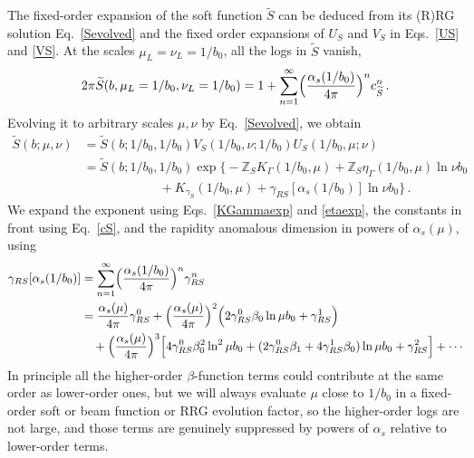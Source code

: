 \documentclass[a4,letterpaper,11pt]{article}
\newcommand{\nn}{\nonumber}
\newcommand{\be}{\begin{equation}}
\newcommand{\ee}{\end{equation}}
\newcommand{\as}{\alpha_s}
\newcommand{\zed}{\mathbb{Z}}
\newcommand{\wt}{\widetilde}
\newcommand{\eq}[1]{Eq.~\eqref{#1}}
\newcommand{\eqs}[2]{Eqs.~\eqref{#1} and \eqref{#2}}
\begin{document}
The fixed-order expansion of the soft function $\wt S$ can be deduced from its (R)RG solution \eq{Sevolved} and the fixed order expansions of $U_S$ and $V_S$ in \eqs{US}{VS}. At the scales $\mu_L =\nu_L= 1/b_0$, all the logs in $\wt S$ vanish,
\be
\label{cS}
2\pi \wt S(b,\mu_L=1/b_0,\nu_L=1/b_0) = 1 + \sum_{n=1}^\infty \Bigl(\frac{\as(1/b_0)}{4\pi}\Bigr)^n c_{\wt S}^n\,.
\ee
Evolving it to arbitrary scales $\mu,\nu$ by \eq{Sevolved}, we obtain
\begin{align}
\label{Sevolved2}
\wt S(b;\mu,\nu) &= \wt S(b;1/b_0,1/b_0) V_S(1/b_0,\nu;1/b_0) U_S(1/b_0,\mu;\nu) \\
&=  \wt S(b;1/b_0,1/b_0)  \exp\biggl\{ - \zed_S K_\Gamma(1/b_0,\mu) + \zed_S \eta_\Gamma(1/b_0,\mu) \ln \nu b_0  \nn \\
& \qquad\qquad\qquad + K_{\gamma_S}(1/b_0,\mu)  + \gamma_{RS}[\as(1/b_0)] \ln\nu b_0\biggr\} \,. \nn
\end{align}
We expand the exponent using \eqs{KGammaexp}{etaexp}, the constants in front using \eq{cS}, and the rapidity anomalous dimension in powers of $\as(\mu)$,
using
\begin{align}
\label{gammaRSexp}
\gamma_{RS}[\as(1/b_0)] &= \sum_{n=1}^\infty \Bigl( \frac{\as(1/b_0)}{4\pi}\Bigr)^n \gamma_{RS}^n \\
&= \frac{\as(\mu)}{4\pi} \gamma_{RS}^0 + \Bigl(\frac{\as(\mu)}{4\pi} \Bigr)^2 \Bigl( 2\gamma_{RS}^0 \beta_0 \ln\mu b_0 + \gamma_{RS}^1\Bigr) \nn \\
&\quad + \Bigl(\frac{\as(\mu)}{4\pi} \Bigr)^3 \Bigl[ 4\gamma_{RS}^0 \beta_0^2 \ln^2\mu b_0 + (2\gamma_{RS}^0 \beta_1 + 4\gamma_{RS}^1\beta_0)\ln \mu b_0 + \gamma_{RS}^2 \Bigr] + \cdots \nn
\end{align}
In principle all the higher-order $\beta$-function terms could contribute at the same order as lower-order ones, but we will always evaluate $\mu$ close to $1/b_0$ in a fixed-order soft or beam function or RRG evolution factor, so the higher-order logs are not large, and those terms are genuinely suppressed by powers of $\as$ relative to lower-order terms.
\end{document}
